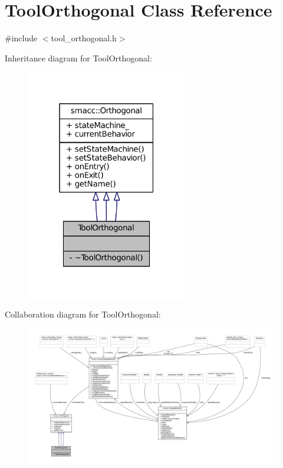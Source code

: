 \hypertarget{classToolOrthogonal}{}\section{Tool\+Orthogonal Class Reference}
\label{classToolOrthogonal}


{\ttfamily \#include $<$tool\+\_\+orthogonal.\+h$>$}



Inheritance diagram for Tool\+Orthogonal\+:
\nopagebreak
\begin{figure}[H]
\begin{center}
\leavevmode
\includegraphics[width=199pt]{classToolOrthogonal__inherit__graph}
\end{center}
\end{figure}


Collaboration diagram for Tool\+Orthogonal\+:
\nopagebreak
\begin{figure}[H]
\begin{center}
\leavevmode
\includegraphics[width=350pt]{classToolOrthogonal__coll__graph}
\end{center}
\end{figure}
